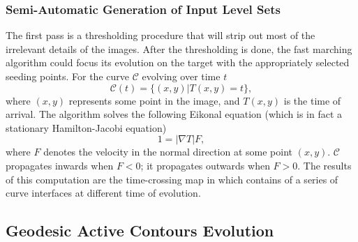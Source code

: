 \subsubsection{Semi-Automatic Generation of Input Level Sets}

The first pass is a thresholding procedure that will strip out most of the irrelevant details of the images.
After the thresholding is done, the fast marching algorithm \cite{Sethian1999} could focus its evolution on the target with the appropriately selected seeding points.
For the curve $\mathcal{C}$ evolving over time $t$
\begin{equation}
\label{eqn:Curves}
\mathcal{C}(t) = \{(x,y) | T(x,y) = t\},
\end{equation}
where $(x,y)$ represents some point in the image, and $T(x,y)$ is the time of arrival.
The algorithm solves the following Eikonal equation (which is in fact a stationary Hamilton-Jacobi equation)
\begin{equation}
1 = | \nabla T | F,
\end{equation}
where $F$ denotes the velocity in the normal direction at some point $(x,y)$.
$\mathcal{C}$ propagates inwards when $F < 0$; it propagates outwards when $F > 0$.
The results of this computation are the time-crossing map in which contains of a series of curve interfaces at different time of evolution.

\subsection{Geodesic Active Contours Evolution}


